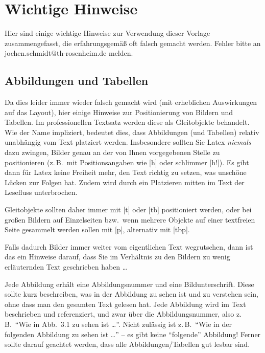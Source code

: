 \chapter{Wichtige Hinweise}
\label{c:intro}

Hier sind einige wichtige Hinweise zur Verwendung dieser Vorlage zusammengefasst, die erfahrungsgemäß oft falsch gemacht werden.
Fehler bitte an jochen.schmidt@th-rosenheim.de melden.


\section{Abbildungen und Tabellen}
\label{s:intro:abc}

Da dies leider immer wieder falsch gemacht wird (mit erheblichen Auswirkungen auf das Layout), hier einige Hinweise zur Positionierung von Bildern und Tabellen.
Im professionellen Textsatz werden diese als Gleitobjekte behandelt.
Wie der Name impliziert, bedeutet dies, dass Abbildungen (und Tabellen) relativ unabhängig vom Text platziert werden.
Insbesondere sollten Sie Latex \emph{niemals} dazu zwingen, Bilder genau an der von Ihnen vorgegebenen Stelle zu positionieren (z.\,B.\ mit Positionsangaben wie [h] oder schlimmer [h!]).
Es gibt dann für Latex keine Freiheit mehr, den Text richtig zu setzen, was unschöne Lücken zur Folgen hat.
Zudem wird durch ein Platzieren mitten im Text der Lesefluss unterbrochen.

\begin{shaded*}
Gleitobjekte sollten daher immer mit [t] oder [tb] positioniert werden, oder bei großen Bildern auf Einzelseiten bzw.\ wenn mehrere Objekte auf einer textfreien Seite gesammelt werden sollen mit [p], alternativ mit [tbp].
\end{shaded*}

Falls dadurch Bilder immer weiter vom eigentlichen Text wegrutschen, dann ist das ein Hinweise darauf, dass Sie im Verhältnis zu den Bildern zu wenig erläuternden Text geschrieben haben \dots

Jede Abbildung erhält eine Abbildungsnummer und eine Bildunterschrift.
Diese sollte kurz beschreiben, was in der Abbildung zu sehen ist und zu verstehen sein, ohne dass man den gesamten Text gelesen hat.
Jede Abbildung wird im Text beschrieben und referenziert, und zwar über die Abbildungsnummer, also z.\,B.\  "`Wie in Abb.\ 3.1 zu sehen ist \dots"'.
Nicht zulässig ist z.\,B.\ "`Wie in der folgenden Abbildung zu sehen ist \dots"' -- es gibt keine "`folgende"' Abbildung!
Ferner sollte darauf geachtet werden, dass alle Abbildungen/Tabellen gut lesbar sind.



